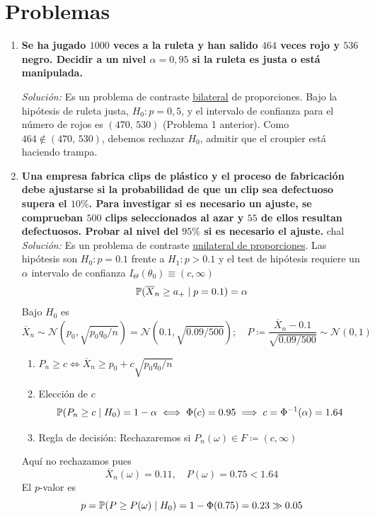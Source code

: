 \section{Problemas}

\begin{enumerate}
  \item \textbf{Se ha jugado $1000$ veces a la ruleta y han salido $464$ veces rojo y $536$ negro. Decidir a un nivel $\alpha = 0{,}95$ si la ruleta es justa o está manipulada.}

  \smallskip
  \noindent\emph{Solución:} Es un problema de contraste \underline{bilateral} de proporciones. Bajo la hipótesis de ruleta justa, $H_0 : p = 0{,}5$, y el intervalo de confianza para el número de rojos es $(470,\, 530)$ (Problema 1 anterior). Como $464 \notin (470,\, 530)$, debemos rechazar $H_0$, admitir que el
  croupier está haciendo trampa.

  \item \textbf{Una empresa fabrica clips de plástico y el proceso de fabricación debe ajustarse si la probabilidad de que un clip sea defectuoso supera el $10\%$. Para investigar si es necesario un ajuste, se comprueban $500$ clips seleccionados al azar y $55$ de ellos resultan defectuosos. Probar al nivel del $95\%$ si es necesario el ajuste.}
chal
  \smallskip
  \noindent\emph{Solución:} Es un problema de contraste \underline{unilateral de proporciones}. Las hipótesis son $H_0 : p = 0.1$ frente a $H_1 : p > 0.1$ y el test de hipótesis requiere un $\alpha$ intervalo de confianza $I_\Theta(\theta_0) \equiv (c, \infty)$
  \[
    \mathbb{P}(\overline{X}_n \geq a_+ \mid p = 0.1) = \alpha
  \]
  Bajo $H_0$ es
  \[
    \overline{X}_n \sim \mathcal N\left(p_0, \sqrt{p_0 q_0 / n}\right) = \mathcal N\left(0.1, \sqrt{0.09 / 500}\right); \quad P \coloneqq \frac{\overline{X}_n - 0.1}{\sqrt{0.09 / 500}} \sim \mathcal N(0, 1)
  \]
  \begin{enumerate}[label=(\alph*)]
    \item $P_n \geq c \iff \overline{X}_n \geq p_0 + c\sqrt{p_0 q_0 / n}$
    \item Elección de $c$
    \[
      \mathbb{P}(P_n \geq c \mid H_0) = 1 - \alpha \iff \Phi(c) = 0.95 \implies c = \Phi^{-1}(\alpha) = 1.64
    \]
    \item Regla de decisión: Rechazaremos si $P_n(\omega) \in F \coloneqq (c, \infty)$
  \end{enumerate}
  Aquí no rechazamos pues
  \[
    \overline{X}_n(\omega) = 0.11, \quad P(\omega) = 0.75 < 1.64
  \]
  El $p$-valor es
  \[
    p = \mathbb{P}(P \geq P(\omega) \mid H_0) = 1 - \Phi(0.75) = 0.23 \gg 0.05
  \]


\end{enumerate}
